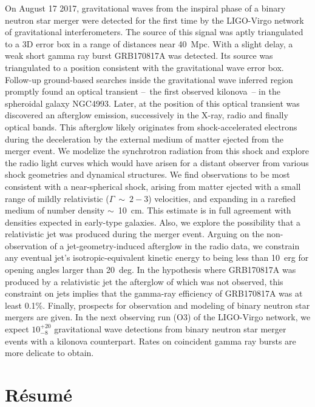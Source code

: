 On August 17 2017, gravitational waves from the inspiral phase of a binary neutron star merger were detected for the first time by the LIGO-Virgo network of gravitational interferometers. The source of this signal was aptly triangulated to a 3D error box in a range of distances near 40~Mpc. With a slight delay, a weak short gamma ray burst GRB170817A was detected. Its source was triangulated to a position consistent with the gravitational wave error box. Follow-up ground-based searches inside the gravitational wave inferred region promptly found an optical transient --~the first observed kilonova~-- in the spheroidal galaxy NGC4993. Later, at the position of this optical transient was discovered an afterglow emission, successively in the X-ray, radio and finally optical bands. This afterglow likely originates from shock-accelerated electrons during the deceleration by the external medium of matter ejected from the merger event. We modelize the synchrotron radiation from this shock and explore the radio light curves which would have arisen for a distant observer from various shock geometries and dynamical structures. We find observations to be most consistent with a near-spherical shock, arising from matter ejected with a small range of mildly relativistic ($\Gamma~\sim~2-3$) velocities, and expanding in a rarefied medium of number density $\sim$~10~cm. This estimate is in full agreement with densities expected in early-type galaxies. Also, we explore the possibility that a relativistic jet was produced during the merger event. Arguing on the non-observation of a jet-geometry-induced afterglow in the radio data, we constrain any eventual jet's isotropic-equivalent kinetic energy to being less than 10~erg for opening angles larger than 20~deg. In the hypothesis where GRB170817A was produced by a relativistic jet the afterglow of which was not observed, this constraint on jets implies that the gamma-ray efficiency of GRB170817A was at least 0.1\%. Finally, prospects for observation and modeling of binary neutron star mergers are given. In the next observing run (O3) of the LIGO-Virgo network, we expect $10^{+20}_{-8}$ gravitational wave detections from binary neutron star merger events with a kilonova counterpart. Rates on coincident gamma ray bursts are more delicate to obtain.

\vfill

\section*{Résumé}

